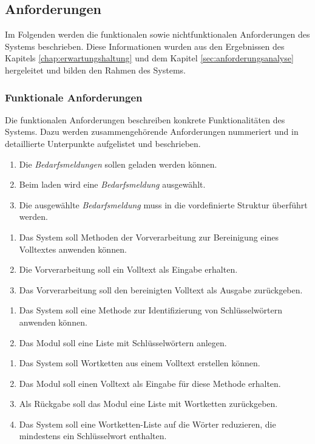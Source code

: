 \subsection{Anforderungen}
Im Folgenden werden die funktionalen sowie nichtfunktionalen Anforderungen des Systems beschrieben. Diese Informationen wurden aus den Ergebnissen des Kapitels \ref{chap:erwartungshaltung} und dem Kapitel \ref{sec:anforderungsanalyse} hergeleitet und bilden den Rahmen des Systems.
\subsubsection{Funktionale Anforderungen}
Die funktionalen Anforderungen beschreiben konkrete Funktionalitäten des Systems. Dazu werden zusammengehörende Anforderungen nummeriert und in detaillierte Unterpunkte aufgelistet und beschrieben.
\begin{enumerate}[label=1.\arabic*]
	\item Die \emph{Bedarfsmeldungen} sollen geladen werden können.
	\item Beim laden wird eine \emph{Bedarfsmeldung} ausgewählt.
	\item Die ausgewählte \emph{Bedarfsmeldung} muss in die vordefinierte Struktur überführt werden.
\end{enumerate}
\begin{enumerate}[label=2.\arabic*]
	\item Das System soll Methoden der Vorverarbeitung zur Bereinigung eines Volltextes anwenden können.
	\item Die Vorverarbeitung soll ein Volltext als Eingabe erhalten.
	\item Das Vorverarbeitung soll den bereinigten Volltext als Ausgabe zurückgeben.
\end{enumerate}
\begin{enumerate}[label=3.\arabic*]
	\item Das System soll eine Methode zur Identifizierung von Schlüsselwörtern anwenden können.
	\item Das Modul soll eine Liste mit Schlüsselwörtern anlegen.
\end{enumerate}
\begin{enumerate}[label=4.\arabic*]
	\item Das System soll Wortketten aus einem Volltext erstellen können.
	\item Das Modul soll einen Volltext als Eingabe für diese Methode erhalten.
	\item Als Rückgabe soll das Modul eine Liste mit Wortketten zurückgeben.
	\item Das System soll eine Wortketten-Liste auf die Wörter reduzieren, die mindestens ein Schlüsselwort enthalten.
\end{enumerate}
